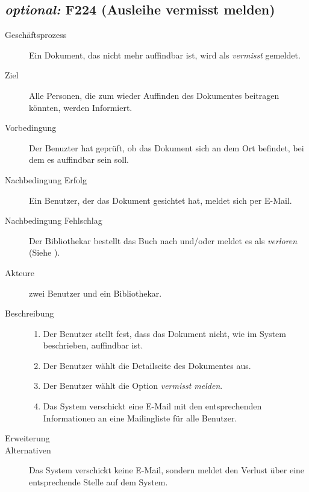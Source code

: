 \subsection{\emph{optional:} F224 (Ausleihe vermisst melden)}
\begin{description}
  \item[Geschäftsprozess]Ein Dokument, das nicht mehr auffindbar ist, wird als \emph{vermisst} gemeldet.
  \item[Ziel]Alle Personen, die zum wieder Auffinden des Dokumentes beitragen könnten, werden Informiert.
  \item[Vorbedingung]Der Benuzter hat geprüft, ob das Dokument sich an dem Ort befindet, bei dem es auffindbar sein soll.
  \item[Nachbedingung Erfolg]Ein Benutzer, der das Dokument gesichtet hat, meldet sich per E-Mail.
  \item[Nachbedingung Fehlschlag]Der Bibliothekar bestellt das Buch nach und/oder meldet es als \emph{verloren} (Siehe ).
  \item[Akteure]zwei Benutzer und ein Bibliothekar.
  \item[Beschreibung]\hfill
    \begin{enumerate}
      \item Der Benutzer stellt fest, dass das Dokument nicht, wie im System beschrieben, auffindbar ist.
      \item Der Benutzer wählt die Detailseite des Dokumentes aus.
      \item Der Benutzer wählt die Option \emph{vermisst melden}.
      \item Das System verschickt eine E-Mail mit den entsprechenden Informationen an eine Mailingliste für alle Benutzer.
    \end{enumerate}
  \item[Erweiterung]
  \item[Alternativen]Das System verschickt keine E-Mail, sondern meldet den Verlust über eine entsprechende Stelle auf dem System.
\end{description}

